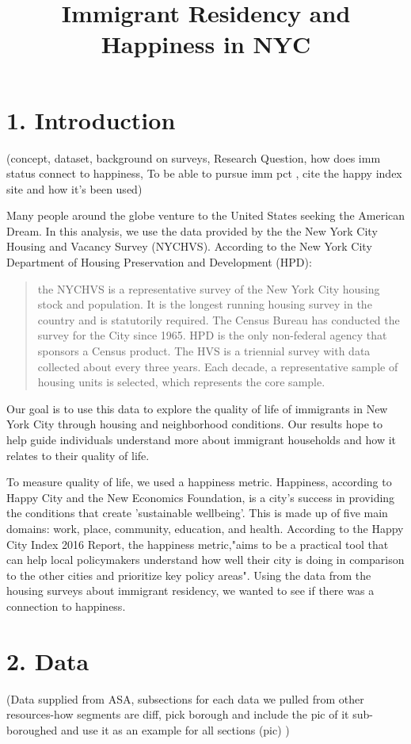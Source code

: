 \documentclass{article}\usepackage[]{graphicx}\usepackage[]{color}
\title{Immigrant Residency and Happiness in NYC}
\begin{document}
\maketitle

\section*{1. Introduction} (concept, dataset, background on surveys, Research Question, how does imm status connect to happiness, To be able to pursue imm pct , cite the happy index site and how it's been used)


Many people around the globe venture to the United States seeking the American Dream. In this analysis, we use the data provided by the the New York City Housing and Vacancy Survey (NYCHVS). According to the New York City Department of Housing Preservation and Development (HPD): \begin{quote} the NYCHVS is a representative survey of the New York City housing stock and population. It is the longest running housing survey in the country and is statutorily required. The Census Bureau has conducted the survey for the City since 1965. HPD is the only non-federal agency that sponsors a Census product. The HVS is a triennial survey with data collected about every three years. Each decade, a representative sample of housing units is selected, which represents the core sample.\end{quote} 
Our goal is to use this data to explore the quality of life of immigrants in New York City through housing and neighborhood conditions. Our results hope to help guide individuals understand more about immigrant households and how it relates to their quality of life.

To measure quality of life, we used a happiness metric. Happiness, according to Happy City and the New Economics Foundation, is a city's success in providing the conditions that create 'sustainable wellbeing'. This is made up of five main domains: work, place, community, education, and health. According to the Happy City Index 2016 Report, the happiness metric,"aims to be a practical tool that can help local policymakers understand how well their city is doing in comparison to the other cities and prioritize key policy areas". Using the data from the housing surveys about immigrant residency, we wanted to see if there was a connection to happiness. 

\section*{2. Data} (Data supplied from ASA, subsections for each data we pulled from other resources-how segments are diff, pick borough and include the pic of it sub-boroughed and use it as an example for all sections (pic) )
\end{document}
